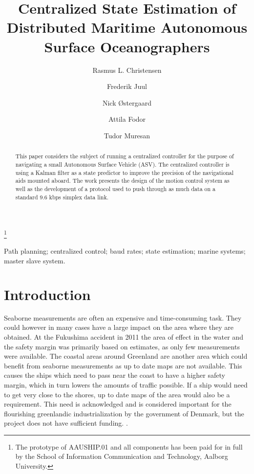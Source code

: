 \documentclass{ifacconf}
\begin{document}
\begin{frontmatter}

\title{Centralized State Estimation of Distributed Maritime Autonomous Surface Oceanographers} %

\thanks[footnoteinfo]{The prototype of AAUSHIP.01 and all components has been paid for in full by the School of Information Communication and Technology, Aalborg University.}

\author{Rasmus L. Christensen} 
\author{Frederik Juul} 
\author{Nick \O stergaard}
\author{Attila Fodor}
\author{Tudor Muresan}
\address{Section of Automation and Control, Department of Electronic Systems, Aalborg University, Fredrik Bajers Vej 7, 9220 Aalborg \O st, Denmark (e-mail: \{ralch,nickoe,fjuul,tmures12,afodor12\}@es.aau.dk)}                                            
          
\begin{keyword}                           %
Path planning; centralized control; baud rates; state estimation; marine systems; master slave system.              %
\end{keyword}                             %


\begin{abstract}                          %
This paper considers the subject of running a centralized controller for the purpose of navigating a small Autonomous Surface Vehicle (ASV). The centralized controller is using a Kalman filter as a state predictor to improve the precision of the navigational aids mounted aboard. The work presents the design of the motion control system as well as the development of a protocol used to push through as much data on a standard 9.6 kbps simplex data link.
\end{abstract}

\end{frontmatter}

\section{Introduction}
Seaborne measurements are often an expensive and time-consuming task. They could however in many cases have a large impact on the area where they are obtained. At the Fukushima accident in 2011 the area of effect in the water and the safety margin was primarily based on estimates, as only few measurements were available.
The coastal areas around Greenland are another area which could benefit from seaborne measurements as up to date maps are not available. This causes the ships which need to pass near the coast to have a higher safety margin, which in turn lowers the amounts of traffic possible. If a ship would need to get very close to the shores, up to date maps of the area would also be a requirement. This need is acknowledged and is considered important for the flourishing greenlandic industrialization by the government of Denmark, but the project does not have sufficient funding. \cite{engineer}.
\end{document}
